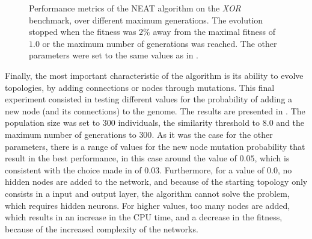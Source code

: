 \begin{figure}
\begin{center}
    \end{center}
    \caption{Performance metrics of the NEAT algorithm on the \textit{XOR} benchmark, over different maximum generations.
    The evolution stopped when the fitness was $2\%$ away from the maximal fitness of $1.0$ or the maximum number of generations was reached.
    The other parameters were set to the same values as in \cite{neat}.}
    \label{fig:neat_xor_generations}
\end{figure}

Finally, the most important characteristic of the algorithm is its ability to evolve topologies, by adding connections or nodes through mutations. This final experiment consisted in testing different
values for the probability of adding a new node (and its connections) to the genome. The results are presented in . The population size was set to $300$ individuals,
the similarity threshold to $8.0$ and the maximum number of generations to $300$. As it was the case for the other parameters, there is a range of values for the new node mutation probability that
result in the best performance, in this case around the value of $0.05$, which is consistent with the choice made in \cite{neat} of $0.03$. Furthermore, for a value of $0.0$, no hidden nodes are added
to the network, and because of the starting topology only consists in a input and output layer, the algorithm cannot solve the problem, which requires hidden neurons. For higher values,
too many nodes are added, which results in an increase in the CPU time, and a decrease in the fitness, because of the increased complexity of the networks.


